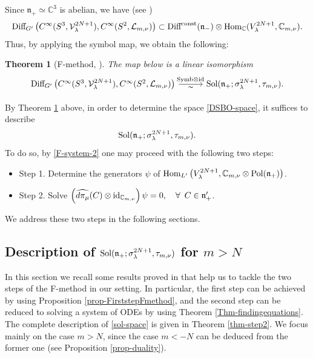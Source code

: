 \documentclass[12pt, pdflatex, a4paper]{article}
\theoremstyle{plain}
\newtheorem{thm}{Theorem}[section]
\theoremstyle{definition}
\def\C{{\mathbb C}}
\def\Diff{\text{\normalfont{Diff}}}
\def\Hom{\text{\normalfont{Hom}}}
\def\id{\text{\normalfont{id}}}
\def\L{\mathcal{L}}
\def\n{\mathfrak{n}}
\def\Pol{\text{\normalfont{Pol}}}
\def\Sol{\text{\normalfont{Sol}}}
\def\Symb{\text{\normalfont{Symb}}}
\def\V{\mathcal{V}}
\begin{document}
Since $\n_+ \simeq \C^3$ is abelian, we have (see \cite[Sec. 4.3]{KP16a})
\begin{equation*}
\Diff_{G^\prime}\left(C^\infty(S^3, \V_\lambda^{2N+1}), C^\infty(S^2, \L_{m,\nu})\right) \subset \Diff^\text{const}(\n_-) \otimes \Hom_\C(V^{2N+1}_\lambda,\C_{m, \nu}).
\end{equation*}
Thus, by applying the symbol map, we obtain the following:
\begin{thm}[F-method, {\cite[Thm. 4.1]{KP16a}}]\label{F-method-thm} The map below is a linear isomorphism
\begin{equation}\label{isomorphism-Fmethod-concrete}
\begin{tikzcd}[column sep = 1cm]
\Diff_{G^\prime}\left(C^\infty(S^3, \V_\lambda^{2N+1}), C^\infty(S^2, \L_{m,\nu})\right) \arrow[r, "\displaystyle{_{\Symb \otimes \id}}", "\thicksim"'] & \Sol(\n_+; \sigma_\lambda^{2N+1}, \tau_{m, \nu}).
\end{tikzcd}
\end{equation}
\end{thm}
By Theorem \ref{F-method-thm} above, in order to determine the space \eqref{DSBO-space}, it suffices to describe 
\begin{equation}\label{sol-space}
\Sol(\n_+; \sigma_\lambda^{2N+1}, \tau_{m,\nu}).
\end{equation}
To do so, by \eqref{F-system-2} one may proceed with the following two steps:
\begin{itemize}[topsep=10pt]
\item Step 1. Determine the generators $\psi$ of $\Hom_{L^\prime}\left(V_\lambda^{2N+1}, \C_{m,\nu} \otimes \Pol(\n_+)\right)$.
\item Step 2. Solve $\left(\widehat{d \pi_\mu}(C) \otimes \id_{\C_{m,\nu}} \right)\psi = 0, \quad \forall \enspace C\in \n_+^\prime$.
\end{itemize}

We address these two steps in the following sections.

\subsection{Description of $\Sol(\n_+; \sigma_\lambda^{2N+1}, \tau_{m, \nu})$ for $m > N$}\label{section-description-of-Sol} 

In this section we recall some results proved in \cite{Per-Val24} that help us to tackle the two steps of the F-method in our setting. In particular, the first step can be achieved by using Proposition \ref{prop-FirststepFmethod}, and the second step can be reduced to solving a system of ODEs by using Theorem \ref{Thm-findingequations}. The complete description of \eqref{sol-space} is given in Theorem \ref{thm-step2}. We focus mainly on the case $m>N$, since the case $m <-N$ can be deduced from the former one (see Proposition \ref{prop-duality}).
\end{document}
